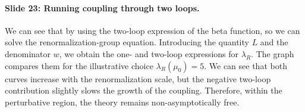 \documentclass[11pt,a4paper]{article}
\begin{document}
\paragraph{Slide 23: Running coupling through two loops.}

We can see that by using the two-loop expression of the beta function, so we can solve the renormalization-group equation. Introducing the quantity $L$ and the denominator $w$, we obtain the one- and two-loop expressions for $\lambda_R$. The graph compares them for the illustrative choice $\lambda_R(\mu_0) = 5$. We can see that both curves increase with the renormalization scale, but the negative two-loop contribution slightly slows the growth of the coupling. Therefore, within the perturbative region, the theory remains non-asymptotically free.
\end{document}
